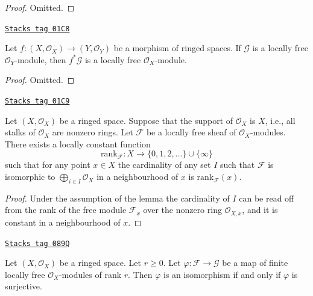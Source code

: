 \begin{proof}
Omitted.
\end{proof}

\begin{lemma}
\label{modules-lemma-pullback-locally-free}
\href{https://stacks.math.columbia.edu/tag/01C8}{\texttt{Stacks tag 01C8}}

Let $f : (X, \mathcal{O}_X) \to (Y, \mathcal{O}_Y)$
be a morphism of ringed spaces. If $\mathcal{G}$ is
a locally free $\mathcal{O}_Y$-module, then
$f^*\mathcal{G}$ is a locally free $\mathcal{O}_X$-module.
\end{lemma}

\begin{proof}
Omitted.
\end{proof}

\begin{lemma}[Rank]
\label{modules-lemma-rank}
\href{https://stacks.math.columbia.edu/tag/01C9}{\texttt{Stacks tag 01C9}}

Let $(X, \mathcal{O}_X)$ be a ringed space.
Suppose that the support of $\mathcal{O}_X$ is $X$,
i.e., all stalks of $\mathcal{O}_X$ are nonzero rings.
Let $\mathcal{F}$ be a locally free sheaf of $\mathcal{O}_X$-modules.
There exists a locally constant function
$$
\text{rank}_\mathcal{F} :
X \longrightarrow \{0, 1, 2, \ldots\}\cup\{\infty\}
$$
such that for any point $x \in X$ the cardinality of any
set $I$ such that $\mathcal{F}$ is isomorphic to
$\bigoplus_{i\in I} \mathcal{O}_X$ in a neighbourhood
of $x$ is $\text{rank}_\mathcal{F}(x)$.
\end{lemma}

\begin{proof}
Under the assumption of the lemma the cardinality of $I$ can be read off
from the rank of the free module $\mathcal{F}_x$ over the nonzero ring
$\mathcal{O}_{X, x}$, and it is constant in a neighbourhood of $x$.
\end{proof}

\begin{lemma}
\label{modules-lemma-map-finite-locally-free}
\href{https://stacks.math.columbia.edu/tag/089Q}{\texttt{Stacks tag 089Q}}

Let $(X, \mathcal{O}_X)$ be a ringed space. Let $r \geq 0$.
Let $\varphi : \mathcal{F} \to \mathcal{G}$ be a map of finite
locally free $\mathcal{O}_X$-modules of rank $r$.
Then $\varphi$ is an isomorphism if and only if $\varphi$
is surjective.
\end{lemma}

